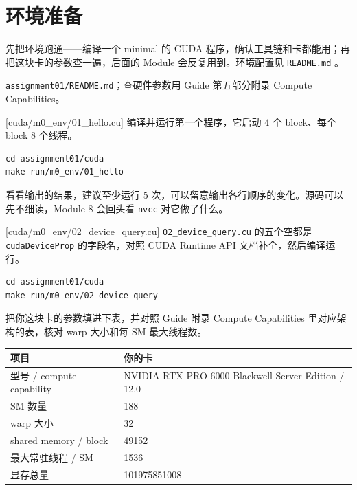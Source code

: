 \documentclass[11pt,a4paper,fontset=none]{ctexart}
\begin{document}
\setcounter{section}{-1}

\section{环境准备}

先把环境跑通——编译一个 minimal 的 CUDA 程序，确认工具链和卡都能用；再把这块卡的参数查一遍，后面的 Module 会反复用到。环境配置见 \texttt{README.md} 。

\begin{reading}
\texttt{assignment01/README.md}；查硬件参数用 Guide 第五部分附录 Compute Capabilities。
\end{reading}

[cuda/m0\_env/01\_hello.cu]
编译并运行第一个程序，它启动 4 个 block、每个 block 8 个线程。

\begin{lstlisting}
cd assignment01/cuda
make run/m0_env/01_hello
\end{lstlisting}

看看输出的结果，建议至少运行 5 次，可以留意输出各行顺序的变化。源码可以先不细读，Module 8 会回头看 \texttt{nvcc} 对它做了什么。

[cuda/m0\_env/02\_device\_query.cu]
\texttt{02\_device\_query.cu} 的五个空都是 \texttt{cudaDeviceProp} 的字段名，对照 CUDA Runtime API 文档补全，然后编译运行。

\begin{lstlisting}
cd assignment01/cuda
make run/m0_env/02_device_query
\end{lstlisting}

把你这块卡的参数填进下表，并对照 Guide 附录 Compute Capabilities 里对应架构的表，核对 warp 大小和每 SM 最大线程数。

\begin{center}\small
\begin{tabular}{@{}ll@{}}
\toprule
项目 & 你的卡 \\
\midrule
型号 / compute capability & NVIDIA RTX PRO 6000 Blackwell Server Edition / 12.0 \\
SM 数量 & 188\\
warp 大小 & 32\\
shared memory / block & 49152\\
最大常驻线程 / SM & 1536\\
显存总量 & 101975851008\\
\bottomrule
\end{tabular}
\end{center}
\end{document}
